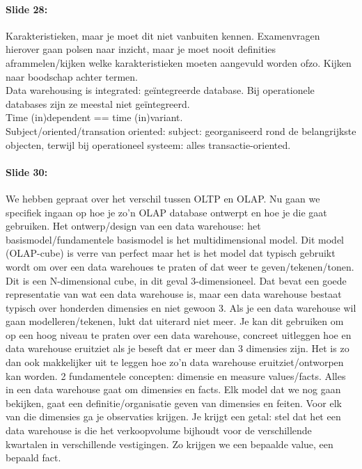 \documentclass[10pt,a4paper]{report}
\begin{document}
\paragraph{Slide 28:}Karakteristieken, maar je moet dit niet vanbuiten kennen. Examenvragen hierover gaan polsen naar inzicht, maar je moet nooit definities aframmelen/kijken welke karakteristieken moeten aangevuld worden ofzo. Kijken naar boodschap achter termen.\\
Data warehousing is integrated: geïntegreerde database. Bij operationele databases zijn ze meestal niet geïntegreerd.\\
Time (in)dependent == time (in)variant.\\
Subject/oriented/transation oriented: subject: georganiseerd rond de belangrijkste objecten, terwijl bij operationeel systeem: alles transactie-oriented.

\paragraph{Slide 30:}We hebben gepraat over het verschil tussen OLTP en OLAP. Nu gaan we specifiek ingaan op hoe je zo'n OLAP database ontwerpt en hoe je die gaat gebruiken. Het ontwerp/design van een data warehouse: het basismodel/fundamentele basismodel is het multidimensional model. Dit model (OLAP-cube) is verre van perfect maar het is het model dat typisch gebruikt wordt om over een data warehoues te praten of dat weer te geven/tekenen/tonen. Dit is een N-dimensional cube, in dit geval 3-dimensioneel. Dat bevat een goede representatie van wat een data warehouse is, maar een data warehouse bestaat typisch over honderden dimensies en niet gewoon 3. Als je een data warehouse wil gaan modelleren/tekenen, lukt dat uiterard niet meer. Je kan dit gebruiken om op een hoog niveau te praten over een data warehouse, concreet uitleggen hoe en data warehouse eruitziet als je beseft dat er meer dan 3 dimensies zijn. Het is zo dan ook makkelijker uit te leggen hoe zo'n data warehouse eruitziet/ontworpen kan worden. 2 fundamentele concepten: dimensie en measure values/facts. Alles in een data warehouse gaat om dimensies en facts. Elk model dat we nog gaan bekijken, gaat een definitie/organisatie geven van dimensies en feiten. Voor elk van die dimensies ga je observaties krijgen. Je krijgt een getal: stel dat het een data warehouse is die het verkoopvolume bijhoudt voor de verschillende kwartalen in verschillende vestigingen. Zo krijgen we een bepaalde value, een bepaald fact.
\end{document}
